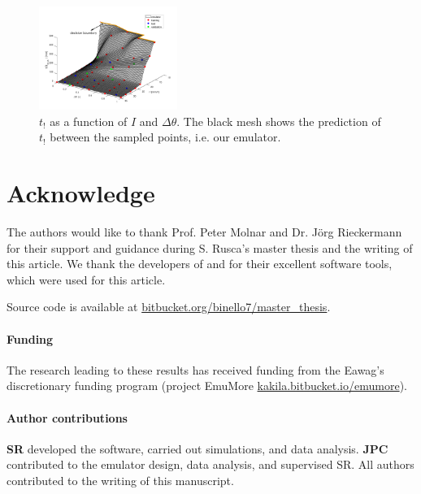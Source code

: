 \documentclass[12pt,a4paper,english,twocolumn,fleqn]{narms}
\begin{document}
\begin{figure}[htpb]
  \centering
  \includegraphics[width=0.4\textwidth]{img/emulator.png}
  \caption{$t_!$ as a function of $I$ and $\Delta\theta$.
  The black mesh shows the prediction of $t_!$ between the sampled points, i.e. our emulator.}
  \label{img:emulator}
\end{figure}



\section{Acknowledge}
The authors would like to thank Prof. Peter Molnar and Dr. Jörg Rieckermann for their support and guidance during S. Rusca's master thesis and the writing of this article.
We thank the developers of  and  for their excellent software tools, which were used for this article.

Source code is available at \url{bitbucket.org/binello7/master_thesis}.

\paragraph*{Funding} The research leading to these results has received funding from the Eawag's discretionary funding program (project EmuMore \url{kakila.bitbucket.io/emumore}).

\paragraph*{Author contributions} \textbf{SR} developed the software, carried out simulations, and data analysis. \textbf{JPC} contributed to the emulator design, data analysis, and supervised SR. All authors contributed to the writing of this manuscript.

\sloppy


\end{document}
